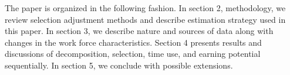 The paper is organized in the following fashion. In section 2, methodology, we review selection adjustment methods and describe estimation strategy used in this paper.  In section 3, we describe  nature and sources of data along with changes in the work force characteristics. Section 4 presents results and discussions of decomposition, selection, time use, and earning potential sequentially. In section 5, we conclude with possible extensions.\par                                                                                                                                                                                                                                                                                       

